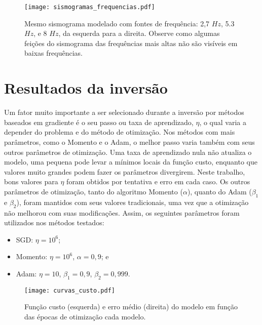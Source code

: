     \begin{figure}
      \begin{center}
        \texttt{[image: sismogramas\_frequencias.pdf]}
      \end{center}
      \caption{Mesmo sismograma modelado com fontes de frequência: 2,7 $Hz$, 5.3 $Hz$, e 8 $Hz$, da esquerda para a direita. Observe como algumas feições do sismograma das frequências mais altas não são visíveis em baixas frequências.}
      \label{f:sismogramas_frequencias}
    \end{figure}


  \section{Resultados da inversão}

    Um fator muito importante a ser selecionado durante a inversão por métodos baseados em gradiente é o seu passo ou taxa de aprendizado, $\eta$, o qual varia a depender do problema e do método de otimização. Nos métodos com mais parâmetros, como o Momento e o Adam, o melhor passo varia também com seus outros parâmetros de otimização. Uma taxa de aprendizado nula não atualiza o modelo, uma pequena pode levar a mínimos locais da função custo, enquanto que valores muito grandes podem fazer os parâmetros divergirem. Neste trabalho, bons valores para $\eta$ foram obtidos por tentativa e erro em cada caso. Os outros parâmetros de otimização, tanto do algoritmo Momento ($\alpha$), quanto do Adam ($\beta_1$ e $\beta_2$), foram mantidos com seus valores tradicionais, uma vez que a otimização não melhorou com suas modificações. Assim, os seguintes parâmetros foram utilizados nos métodos testados:

    \begin{itemize}
      \item SGD: $\eta=10^6$;
      \item Momento: $\eta=10^6$, $\alpha=0,9$; e
      \item Adam: $\eta=10$, $\beta_1=0,9$, $\beta_2=0,999$.
    \end{itemize}

    \begin{figure}
      \begin{center}
        \texttt{[image: curvas\_custo.pdf]}
      \end{center}
      \caption{Função custo (esquerda) e erro médio (direita) do modelo em função das épocas de otimização \DIFdelbeginFL {}\DIFdelendFL \DIFaddbeginFL {}\DIFaddendFL cada modelo.}
      \label{f:curvas_custo}
    \end{figure}

